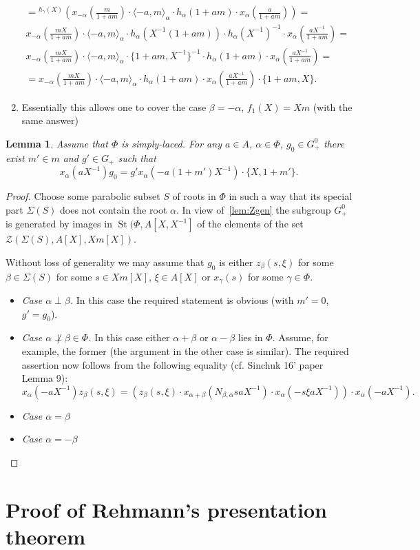 \documentclass[oneside, 10pt]{amsart}
\newtheorem{lemma}{Lemma}
\theoremstyle{remark}
\theoremstyle{definition}
\DeclareMathOperator{\St}{St}
\begin{document}
\begin{enumerate}
\begin{multline}
 = {}^{h_\gamma(X)}\left( x_{-\alpha}\left(\frac{m}{1+am}\right) \cdot \langle -a, m\rangle_\alpha \cdot h_\alpha(1+am) \cdot x_\alpha\left(\frac{a}{1+am}\right) \right) = \\
 x_{-\alpha}\left(\frac{mX}{1+am}\right) \cdot \langle -a, m\rangle_\alpha \cdot h_\alpha(X^{-1}(1+am))\cdot h_\alpha(X^{-1})^{-1} \cdot x_{\alpha}\left(\frac{aX^{-1}}{1+am}\right) = \\
 x_{-\alpha}\left(\frac{mX}{1+am}\right) \cdot \langle -a, m\rangle_\alpha \cdot \{1+am, X^{-1}\}^{-1} \cdot h_\alpha(1+am)\cdot x_{\alpha}\left(\frac{aX^{-1}}{1+am}\right) = \\
 = x_{-\alpha}\left(\frac{mX}{1+am}\right) \cdot \langle -a, m\rangle_\alpha \cdot h_\alpha(1+am) \cdot x_{\alpha}\left(\frac{aX^{-1}}{1+am}\right) \cdot \{1+am, X\}.
\end{multline}
 \item Essentially this allows one to cover the case $\beta = -\alpha$, $f_1(X) = Xm$ (with the same answer)
\end{enumerate}
 
\begin{lemma} Assume that $\Phi$ is simply-laced.
 For any $a\in A$, $\alpha\in \Phi$, $g_0 \in G^0_+$ there exist $m'\in m$ and $g'\in G_+$ such that 
 \[x_{\alpha}(aX^{-1}) g_0  = g' x_\alpha(-a(1+m')X^{-1}) \cdot \{X, 1+m'\}.\]
\end{lemma}
\begin{proof}
 Choose some parabolic subset $S$ of roots in $\Phi$ in such a way that its special part $\Sigma(S)$ does not contain the root $\alpha$.
 In view of~\cref{lem:Zgen} the subgroup $G_+^0$ is generated by images in $\St(\Phi, A[X, X^{-1}]$ of the elements of the set $\mathcal{Z}(\Sigma(S), A[X], Xm[X])$.
 
 Without loss of generality we may assume that $g_0$ is either $z_\beta(s, \xi)$ for some $\beta\in \Sigma(S)$ for some $s\in Xm[X]$, $\xi\in A[X]$ or $x_\gamma(s)$ for some $\gamma \in \Phi$.
 \begin{itemize}
  \item {\it Case $\alpha \perp \beta$. } In this case the required statement is obvious (with $m'=0$, $g'=g_0$).
  \item {\it Case $\alpha \not \perp \beta \in \Phi$.} In this case either $\alpha + \beta$ or $\alpha - \beta$ lies in $\Phi$.
  Assume, for example, the former (the argument in the other case is similar).
  The required assertion now follows from the following equality (cf. Sinchuk 16' paper Lemma 9):
  \[ x_\alpha(-aX^{-1}) z_\beta(s, \xi) =  \left( z_\beta(s, \xi) \cdot x_{\alpha+\beta}(N_{\beta,\alpha}saX^{-1}) \cdot x_\alpha(-s\xi aX^{-1}) \right) \cdot x_\alpha(-aX^{-1}).\]
  \item {\it Case $\alpha = \beta$}
  \item {\it Case $\alpha = -\beta$}
 \end{itemize}

\end{proof}

\section{Proof of Rehmann's presentation theorem}

\printbibliography
\end{document}
